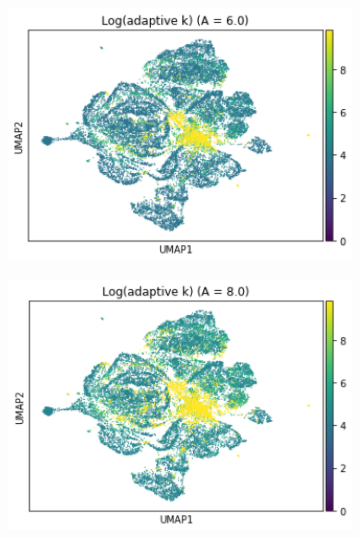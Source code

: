 \documentclass{article}
\begin{document}
\begin{figure}
    \begin{subfigure}[t]{0.32\textwidth}
    \centering
        \includegraphics[width=\linewidth]{figs/notMNIST/notMNIST_logadaK_Aeq6.png} 
    \end{subfigure}
    \begin{subfigure}[t]{0.32\textwidth}
        \centering
        \includegraphics[width=\linewidth]{figs/notMNIST/notMNIST_logadaK_Aeq8.png} 
    \end{subfigure}
    \begin{subfigure}[t]{0.32\textwidth}
        \centering

\end{subfigure}
\end{figure}
\end{document}

